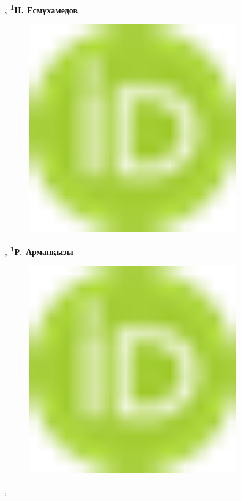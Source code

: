 {\bfseries ,
\textsuperscript{1}Н.
Есмұхамедов}
\begin{figure}[H]
	\centering
	\includegraphics[width=0.8\textwidth]{media/ict/image16}
	\caption*{}
\end{figure}
{\bfseries ,
\textsuperscript{1}Р.
Арманқызы}
\begin{figure}[H]
	\centering
	\includegraphics[width=0.8\textwidth]{media/ict/image16}
	\caption*{}
\end{figure}
,

